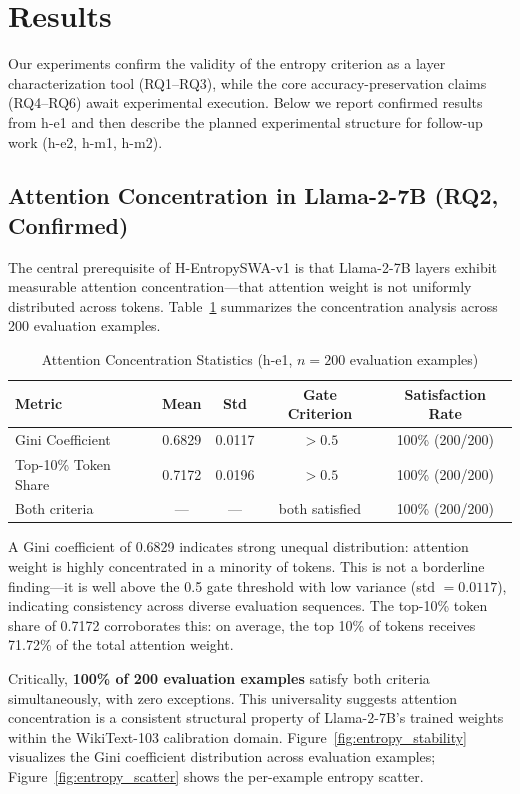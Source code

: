 \section{Results}
\label{sec:results}

Our experiments confirm the validity of the entropy criterion as a layer characterization tool (RQ1--RQ3), while the core accuracy-preservation claims (RQ4--RQ6) await experimental execution. Below we report confirmed results from h-e1 and then describe the planned experimental structure for follow-up work (h-e2, h-m1, h-m2).

\subsection{Attention Concentration in Llama-2-7B (RQ2, Confirmed)}

The central prerequisite of H-EntropySWA-v1 is that Llama-2-7B layers exhibit measurable attention concentration---that attention weight is not uniformly distributed across tokens. Table~\ref{tab:concentration} summarizes the concentration analysis across 200 evaluation examples.

\begin{table}[h]
\centering
\caption{Attention Concentration Statistics (h-e1, $n=200$ evaluation examples)}
\label{tab:concentration}
\begin{tabular}{lcccc}
\toprule
Metric & Mean & Std & Gate Criterion & Satisfaction Rate \\
\midrule
Gini Coefficient & 0.6829 & 0.0117 & $> 0.5$ & 100\% (200/200) \\
Top-10\% Token Share & 0.7172 & 0.0196 & $> 0.5$ & 100\% (200/200) \\
Both criteria & --- & --- & both satisfied & 100\% (200/200) \\
\bottomrule
\end{tabular}
\end{table}

A Gini coefficient of 0.6829 indicates strong unequal distribution: attention weight is highly concentrated in a minority of tokens. This is not a borderline finding---it is well above the 0.5 gate threshold with low variance (std $= 0.0117$), indicating consistency across diverse evaluation sequences. The top-10\% token share of 0.7172 corroborates this: on average, the top 10\% of tokens receives 71.72\% of the total attention weight.

Critically, \textbf{100\% of 200 evaluation examples} satisfy both criteria simultaneously, with zero exceptions. This universality suggests attention concentration is a consistent structural property of Llama-2-7B's trained weights within the WikiText-103 calibration domain. Figure~\ref{fig:entropy_stability} visualizes the Gini coefficient distribution across evaluation examples; Figure~\ref{fig:entropy_scatter} shows the per-example entropy scatter.


